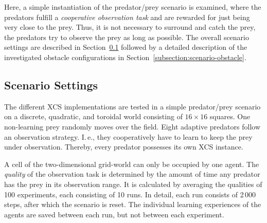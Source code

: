 Here, a simple instantiation of the predator/prey scenario is examined, where the predators fulfill a \emph{cooperative observation task} and are rewarded for just being very close to the prey. Thus, it is not necessary to surround and catch the prey, the predators try to observe the prey as long as possible. The overall scenario settings are described in Section~\ref{subsection:scenario-settings} followed by a detailed description of the investigated obstacle configurations in Section~\ref{subsection:scenario-obstacle}. %

\subsection{Scenario Settings}
\label{subsection:scenario-settings}

The different XCS implementations are tested in a simple predator/prey scenario on a discrete, quadratic, and toroidal world consisting of $16 \times 16$ squares. One non-learning prey randomly moves over the field. %
Eight adaptive predators follow an observation strategy. I.\,e., they cooperatively have to learn to keep the prey under observation. Thereby, every predator possesses its own XCS instance. 

A cell of the two-dimensional grid-world can only be occupied by one agent. The \emph{quality} of the observation task is determined by the amount of time any predator has the prey in its observation range. It is calculated by averaging the qualities of 100 experiments, each consisting of 10 runs. In detail, each run consists of 2\,000 steps, after which the scenario is reset. The individual learning experiences of the agents are saved between each run, but not between each experiment.

